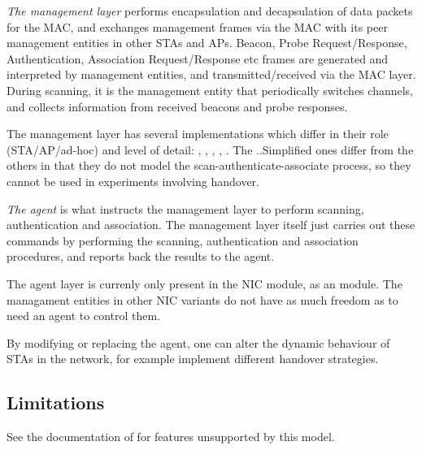 \textit{The management layer} performs encapsulation and decapsulation of data packets
for the MAC, and exchanges management frames via the MAC with its peer
management entities in other STAs and APs. Beacon, Probe Request/Response,
Authentication, Association Request/Response etc frames are generated
and interpreted by management entities, and transmitted/received via
the MAC layer. During scanning, it is the management entity that periodically
switches channels, and collects information from received beacons and
probe responses.

The management layer has several implementations which differ in their role
(STA/AP/ad-hoc) and level of detail: ,
, , ,
. The ..Simplified ones differ from the others
in that they do not model the scan-authenticate-associate process,
so they cannot be used in experiments involving handover.

\textit{The agent} is what instructs the management layer to perform
scanning, authentication and association. The management layer itself
just carries out these commands by performing the scanning, authentication
and association procedures, and reports back the results to the agent.

The agent layer is currenly only present in the  NIC module,
as an  module. The managament entities in other NIC
variants do not have as much freedom as to need an agent to control them.

By modifying or replacing the agent, one can alter the dynamic behaviour
of STAs in the network, for example implement different handover strategies.

\subsection{Limitations}

See the documentation of  for features unsupported by this
model.

\iffalse TODO
 further details about the implementation: what is modelled and what is
 not (beacons, auth, ...), communication between modules, frame formats,
 ...
\fi




